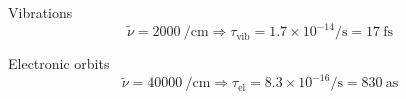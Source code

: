 Vibrations
\begin{equation}
\tilde{\nu} = \SI{2000}{\per\centi\meter} \Rightarrow \tau_\mathrm{vib} = 1.7 \times 10^{-14} \si{\per\second}
= \SI{17}{\femto\second}
\end{equation}

Electronic orbits
\begin{equation}
\tilde{\nu} = \SI{40000}{\per\centi\meter} \Rightarrow \tau_\mathrm{el} = 8.3 \times 10^{-16} \si{\per\second}
= \SI{830}{\atto\second}
\end{equation}






